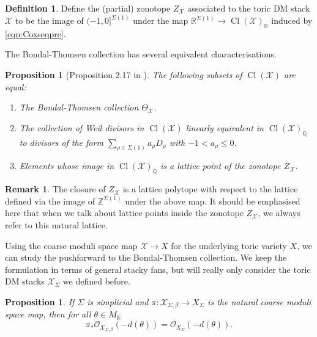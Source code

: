 \documentclass[reqno, 12pt]{amsart}
\newtheorem{proposition}[theorem]{Proposition}
\theoremstyle{definition}
\newtheorem{definition}[theorem]{Definition}
\newtheorem{remark}[theorem]{Remark}
\numberwithin{equation}{section}
\newcommand{\Z}{\mathbb{Z}}
\newcommand{\R}{\mathbb{R}}
\newcommand{\Q}{\mathbb{Q}}
\def\O{\mathcal{O}}
\begin{document}
\begin{definition}
\label{Def:Zonotope}
Define the (partial) zonotope $Z_\mathcal{X}$ associated to the toric DM stack $\mathcal{X}$ to be the image of $(-1,0]^{\Sigma(1)}$ under the map $\R^{\Sigma(1)}\rightarrow \operatorname{Cl}(\mathcal{X})_{\R}$ induced by \eqref{eqn:Coxseqpre}.
\end{definition}

\noindent The Bondal-Thomsen collection has several equivalent characterisations.

\begin{proposition}[Proposition 2.17 in \cite{BBB+}]
    \label{Prop:BTcollnequiv}
    The following subsets of $\operatorname{Cl}(\mathcal{X})$ are equal:
    \begin{enumerate}
        \item The Bondal-Thomsen collection $\Theta_\mathcal{X}$.
        \item The collection of Weil divisors in $\operatorname{Cl}(\mathcal{X})$ linearly equivalent in $\operatorname{Cl}(\mathcal{X})_\Q$ to divisors of the form $\sum_{\rho\in \Sigma(1)}a_\rho D_\rho$ with $-1<a_\rho\le0$.
        \item Elements whose image in $\operatorname{Cl}(\mathcal{X})_\Q$ is a lattice point of the zonotope $Z_\mathcal{X}$.
    \end{enumerate}
\end{proposition}

\begin{remark}
    The closure of $Z_{\mathcal{X}}$ is a lattice polytope with respect to the lattice defined via the image of $\Z^{\Sigma(1)}$ under the above map. It should be emphasised here that when we talk about lattice points inside the zonotope $Z_{\mathcal{X}}$, we always refer to this natural lattice.
\end{remark}


Using the coarse moduli space map $\mathcal{X}\rightarrow X$ for the underlying toric variety $X$, we can study the pushforward to the Bondal-Thomsen collection. We keep the formulation in terms of general stacky fans, but will really only consider the toric DM stacks $\mathcal{X}_\Sigma$ we defined before.

\begin{proposition}
    \label{Prop:CoarseModuli}
    If $\Sigma$ is simplicial and $\pi:\mathcal{X}_{\Sigma,\beta}\rightarrow X_\Sigma$ is the natural coarse moduli space map, then for all $\theta\in M_\R$
    \[
    \pi_\ast\O_{\mathcal{X}_{\Sigma,\beta}}(-d(\theta))=\O_{X_\Sigma}(-d(\theta)).
    \]
\end{proposition}
\end{document}
